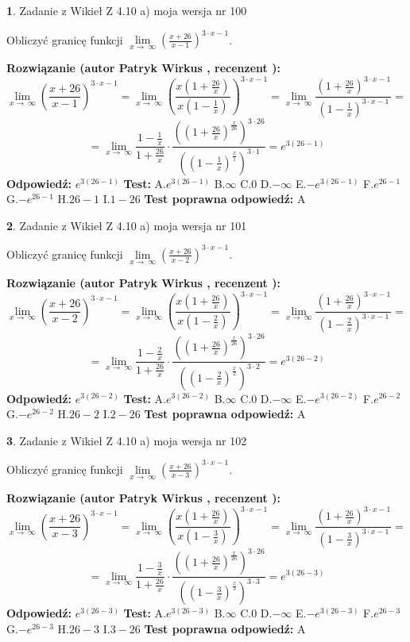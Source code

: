 \documentclass[12pt, a4paper]{article}
\theoremstyle{definition} %
\newtheorem{zad}{}
\newcommand{\zadStart}[1]{\begin{zad}#1\newline}
\newcommand{\zadStop}{\end{zad}}
\newcommand{\rozwStart}[2]{\noindent \textbf{Rozwiązanie (autor #1 , recenzent #2): }\newline}
\newcommand{\rozwStop}{\newline}
\newcommand{\odpStart}{\noindent \textbf{Odpowiedź:}\newline}
\newcommand{\odpStop}{\newline}
\newcommand{\testStart}{\noindent \textbf{Test:}\newline}
\newcommand{\testStop}{\newline}
\newcommand{\kluczStart}{\noindent \textbf{Test poprawna odpowiedź:}\newline}
\newcommand{\kluczStop}{\newline}
\begin{document}
\zadStart{Zadanie z Wikieł Z 4.10 a) moja wersja nr 100}


Obliczyć granicę funkcji  $\lim\limits_{x\to\ \infty}(\frac{x+26}{x-1})^{3\cdot x-1}$.
\zadStop
\rozwStart{Patryk Wirkus}{}
$$\lim\limits_{x\to\ \infty}(\frac{x+26}{x-1})^{3\cdot x-1} = \lim\limits_{x\to\ \infty}(\frac{x(1+\frac{26}{x})}{x(1-\frac{1}{x})})^{3\cdot x-1}=\lim\limits_{x\to\ \infty}\frac{(1+\frac{26}{x})^{3\cdot x-1}}{(1-\frac{1}{x})^{3\cdot x-1}}=$$
$$=\lim\limits_{x\to\ \infty}\frac{1-\frac{1}{x}}{1+\frac{26}{x}}\cdot\frac{((1+\frac{26}{x})^{\frac{x}{26}})^{3\cdot26}}{((1-\frac{1}{x})^{\frac{x}{1}})^{3\cdot1}}=e^{3(26-1)}$$
\rozwStop
\odpStart
$e^{3(26-1)}$
\odpStop
\testStart
A.$e^{3(26-1)}$ B.$\infty$ C.$0$ D.$-\infty$ E.$-e^{3(26-1)}$
F.$e^{26-1}$ G.$-e^{26-1}$
H.$26-1$
I.$1-26$
\testStop
\kluczStart
A
\kluczStop



\zadStart{Zadanie z Wikieł Z 4.10 a) moja wersja nr 101}


Obliczyć granicę funkcji  $\lim\limits_{x\to\ \infty}(\frac{x+26}{x-2})^{3\cdot x-1}$.
\zadStop
\rozwStart{Patryk Wirkus}{}
$$\lim\limits_{x\to\ \infty}(\frac{x+26}{x-2})^{3\cdot x-1} = \lim\limits_{x\to\ \infty}(\frac{x(1+\frac{26}{x})}{x(1-\frac{2}{x})})^{3\cdot x-1}=\lim\limits_{x\to\ \infty}\frac{(1+\frac{26}{x})^{3\cdot x-1}}{(1-\frac{2}{x})^{3\cdot x-1}}=$$
$$=\lim\limits_{x\to\ \infty}\frac{1-\frac{2}{x}}{1+\frac{26}{x}}\cdot\frac{((1+\frac{26}{x})^{\frac{x}{26}})^{3\cdot26}}{((1-\frac{2}{x})^{\frac{x}{2}})^{3\cdot2}}=e^{3(26-2)}$$
\rozwStop
\odpStart
$e^{3(26-2)}$
\odpStop
\testStart
A.$e^{3(26-2)}$ B.$\infty$ C.$0$ D.$-\infty$ E.$-e^{3(26-2)}$
F.$e^{26-2}$ G.$-e^{26-2}$
H.$26-2$
I.$2-26$
\testStop
\kluczStart
A
\kluczStop



\zadStart{Zadanie z Wikieł Z 4.10 a) moja wersja nr 102}


Obliczyć granicę funkcji  $\lim\limits_{x\to\ \infty}(\frac{x+26}{x-3})^{3\cdot x-1}$.
\zadStop
\rozwStart{Patryk Wirkus}{}
$$\lim\limits_{x\to\ \infty}(\frac{x+26}{x-3})^{3\cdot x-1} = \lim\limits_{x\to\ \infty}(\frac{x(1+\frac{26}{x})}{x(1-\frac{3}{x})})^{3\cdot x-1}=\lim\limits_{x\to\ \infty}\frac{(1+\frac{26}{x})^{3\cdot x-1}}{(1-\frac{3}{x})^{3\cdot x-1}}=$$
$$=\lim\limits_{x\to\ \infty}\frac{1-\frac{3}{x}}{1+\frac{26}{x}}\cdot\frac{((1+\frac{26}{x})^{\frac{x}{26}})^{3\cdot26}}{((1-\frac{3}{x})^{\frac{x}{3}})^{3\cdot3}}=e^{3(26-3)}$$
\rozwStop
\odpStart
$e^{3(26-3)}$
\odpStop
\testStart
A.$e^{3(26-3)}$ B.$\infty$ C.$0$ D.$-\infty$ E.$-e^{3(26-3)}$
F.$e^{26-3}$ G.$-e^{26-3}$
H.$26-3$
I.$3-26$
\testStop
\kluczStart
A
\kluczStop
\end{document}
